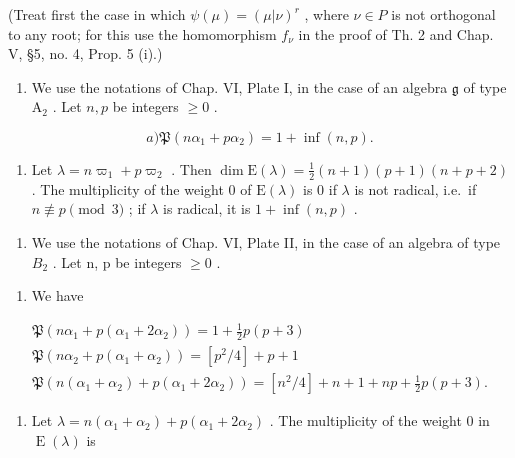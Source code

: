 (Treat first the case in which \(\psi(\mu)=(\mu|\nu)^{r}\) , where \(\nu\in P\) is not orthogonal to any root; for this use the homomorphism \(f_{\nu}\) in the proof of Th. 2 and Chap. V, §5, no. 4, Prop. 5 (i).)

\begin{enumerate}
\def\labelenumi{\arabic{enumi})}
\setcounter{enumi}{8}
\tightlist
\item
  We use the notations of Chap. VI, Plate I, in the case of an algebra \(\mathfrak{g}\) of type \(\mathrm{A}_2\) . Let \(n, p\) be integers \(\geq 0\) .
\end{enumerate}

\[
a) \mathfrak {P} (n \alpha_ {1} + p \alpha_ {2}) = 1 + \inf (n, p).
\]

\begin{enumerate}
\def\labelenumi{\alph{enumi})}
\setcounter{enumi}{1}
\tightlist
\item
  Let \(\lambda = n\varpi_1 + p\varpi_2\) . Then \(\dim \mathrm{E}(\lambda) = \frac{1}{2}(n + 1)(p + 1)(n + p + 2)\) . The multiplicity of the weight 0 of \(\mathrm{E}(\lambda)\) is 0 if \(\lambda\) is not radical, i.e.~if \(n \not\equiv p \pmod{3}\) ; if \(\lambda\) is radical, it is \(1 + \inf(n,p)\) .
\end{enumerate}

\begin{enumerate}
\def\labelenumi{\arabic{enumi})}
\setcounter{enumi}{9}
\tightlist
\item
  We use the notations of Chap. VI, Plate II, in the case of an algebra of type \(B_{2}\) . Let n, p be integers \(\geq 0\) .
\end{enumerate}

\begin{enumerate}
\def\labelenumi{\alph{enumi})}
\tightlist
\item
  We have
\end{enumerate}

\[
\begin{array}{c} \mathfrak {P} (n \alpha_ {1} + p (\alpha_ {1} + 2 \alpha_ {2})) = 1 + \frac {1}{2} p (p + 3) \\ \mathfrak {P} (n \alpha_ {2} + p (\alpha_ {1} + \alpha_ {2})) = [ p ^ {2} / 4 ] + p + 1 \\ \mathfrak {P} (n (\alpha_ {1} + \alpha_ {2}) + p (\alpha_ {1} + 2 \alpha_ {2})) = [ n ^ {2} / 4 ] + n + 1 + n p + \frac {1}{2} p (p + 3). \end{array}
\]

\begin{enumerate}
\def\labelenumi{\alph{enumi})}
\setcounter{enumi}{1}
\tightlist
\item
  Let \(\lambda = n(\alpha_{1} + \alpha_{2}) + p(\alpha_{1} + 2\alpha_{2})\) . The multiplicity of the weight 0 in \(\operatorname{E}(\lambda)\) is
\end{enumerate}

